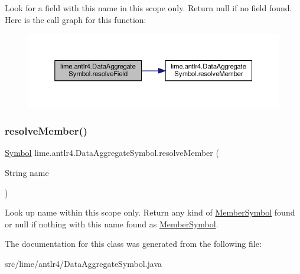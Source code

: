 Look for a field with this name in this scope only. Return null if no field found. Here is the call graph for this function\+:
\nopagebreak
\begin{figure}[H]
\begin{center}
\leavevmode
\includegraphics[width=350pt]{classlime_1_1antlr4_1_1DataAggregateSymbol_a0a1d90d6144f8c30e7733af041cc46f2_cgraph}
\end{center}
\end{figure}
\mbox{\label{classlime_1_1antlr4_1_1DataAggregateSymbol_a59dd410b45c3761c12cff84c2bdb5a58}} 
\subsubsection{\texorpdfstring{resolve\+Member()}{resolveMember()}}
{\footnotesize\ttfamily \hyperlink{interfacelime_1_1antlr4_1_1Symbol}{Symbol} lime.\+antlr4.\+Data\+Aggregate\+Symbol.\+resolve\+Member (\begin{DoxyParamCaption}\item[{String}]{name }\end{DoxyParamCaption})}

Look up name within this scope only. Return any kind of \hyperlink{interfacelime_1_1antlr4_1_1MemberSymbol}{Member\+Symbol} found or null if nothing with this name found as \hyperlink{interfacelime_1_1antlr4_1_1MemberSymbol}{Member\+Symbol}. 

The documentation for this class was generated from the following file\+:\begin{DoxyCompactItemize}
\item 
src/lime/antlr4/Data\+Aggregate\+Symbol.\+java\end{DoxyCompactItemize}
